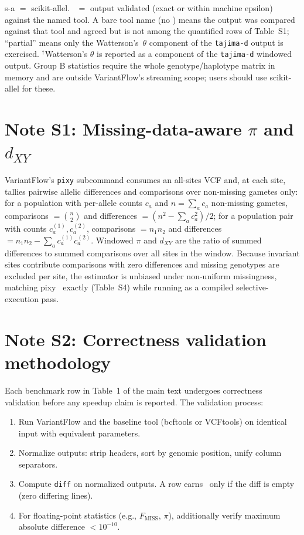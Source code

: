\documentclass[11pt]{article}
\newcommand{\yes}{\checkmark}
\begin{document}
\begin{table}[ht]
\footnotesize{s-a $=$ scikit-allel. \yes\ $=$ output validated (exact or within
machine epsilon) against the named tool. A bare tool name (no \yes) means the
output was compared against that tool and agreed but is not among the quantified
rows of Table~S1; ``partial'' means only the Watterson's~$\theta$ component of
the \texttt{tajima-d} output is exercised. $^{\dag}$Watterson's $\theta$ is
reported as a component of the \texttt{tajima-d} windowed output. Group B statistics
require the whole genotype/haplotype matrix in memory and are outside
VariantFlow's streaming scope; users should use scikit-allel for these.}
\end{table}

\newpage
\section*{Note S1: Missing-data-aware $\pi$ and $d_{XY}$}

VariantFlow's \texttt{pixy} subcommand consumes an all-sites VCF and, at each
site, tallies pairwise allelic differences and comparisons over non-missing
gametes only: for a population with per-allele counts $c_a$ and
$n=\sum_a c_a$ non-missing gametes, comparisons $=\binom{n}{2}$ and
differences $=(n^2-\sum_a c_a^2)/2$; for a population pair with counts
$c^{(1)}_a,c^{(2)}_a$, comparisons $=n_1 n_2$ and differences
$=n_1 n_2-\sum_a c^{(1)}_a c^{(2)}_a$. Windowed $\pi$ and $d_{XY}$ are the
ratio of summed differences to summed comparisons over all sites in the
window. Because invariant sites contribute comparisons with zero differences
and missing genotypes are excluded per site, the estimator is unbiased under
non-uniform missingness, matching pixy~\citep{pixy2021} exactly (Table~S4)
while running as a compiled selective-execution pass.

\newpage
\section*{Note S2: Correctness validation methodology}

Each benchmark row in Table~1 of the main text undergoes correctness
validation before any speedup claim is reported. The validation process:

\begin{enumerate}
\item Run VariantFlow and the baseline tool (bcftools or VCFtools) on
  identical input with equivalent parameters.
\item Normalize outputs: strip headers, sort by genomic position, unify
  column separators.
\item Compute \texttt{diff} on normalized outputs. A row earns
  \checkmark\ only if the diff is empty (zero differing lines).
\item For floating-point statistics (e.g., $F_{\text{MISS}}$, $\pi$),
  additionally verify maximum absolute difference $<10^{-10}$.
\end{enumerate}
\end{document}
